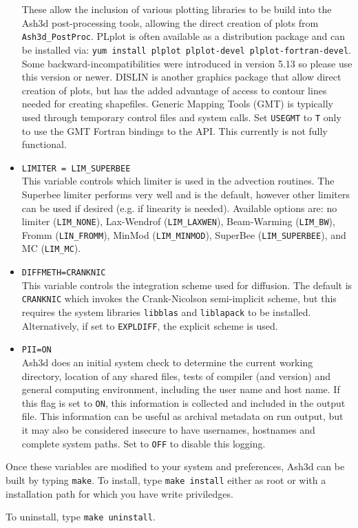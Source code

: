 \begin{itemize}
 These allow the inclusion of various plotting libraries to be build into the Ash3d
post-processing tools, allowing the direct creation of plots from \texttt{Ash3d\_PostProc}.
PLplot is often available as a distribution package and can be installed via:
\texttt{yum install plplot plplot-devel plplot-fortran-devel}. Some backward-incompatibilities
were introduced in version 5.13 so please use this version or newer. DISLIN is another
graphics package that allow direct creation of plots, but has the added advantage of
access to contour lines needed for creating shapefiles. Generic Mapping Tools (GMT)
is typically used through temporary control files and system calls.  Set \texttt{USEGMT}
to \texttt{T} only to use the GMT Fortran bindings to the API. This currently is not
fully functional.
 \item \texttt{LIMITER = LIM\_SUPERBEE}\\
This variable controls which limiter is used in the advection routines.  The
Superbee limiter performs very well and is the default, however other limiters
can be used if desired (e.g. if linearity is needed).  Available options are:
no limiter (\texttt{LIM\_NONE}), Lax-Wendrof (\texttt{LIM\_LAXWEN}),
Beam-Warming (\texttt{LIM\_BW}), Fromm (\texttt{LIN\_FROMM}), 
MinMod (\texttt{LIM\_MINMOD}), SuperBee (\texttt{LIM\_SUPERBEE}),
and MC (\texttt{LIM\_MC}).
 \item \texttt{DIFFMETH=CRANKNIC}\\
This variable controls the integration scheme used for diffusion.  The default
is \texttt{CRANKNIC} which invokes the Crank-Nicolson semi-implicit scheme, but
this requires the  system libraries \texttt{libblas} and \texttt{liblapack} to be installed.
Alternatively, if set to \texttt{EXPLDIFF}, the explicit scheme is used.
 \item \texttt{PII=ON}\\
Ash3d does an initial system check to determine the current working directory, location
of any shared files, tests of compiler (and version) and general computing
environment, including the user name and host name. If this flag is set to \texttt{ON}, this
information is collected and included in the output file.  This information
can be useful as archival metadata on run output, but it may also be considered insecure
to have usernames, hostnames and complete system paths. Set to \texttt{OFF} to
disable this logging.
\end{itemize}

Once these variables are modified to your system and preferences, Ash3d can
be built by typing \texttt{make}.  To install, type \texttt{make install}
either as root or with a installation path for which you have write
priviledges.

To uninstall, type \texttt{make uninstall}.
